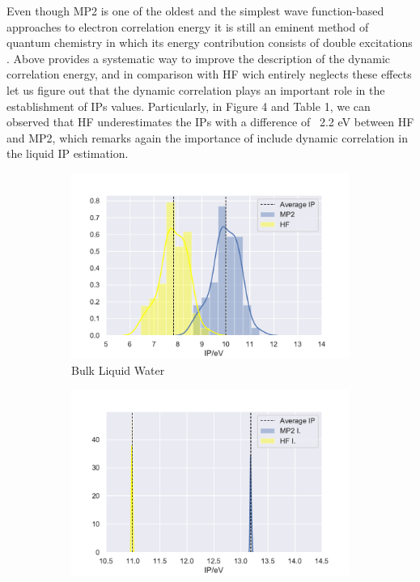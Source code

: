 \documentclass[12pt,a4paper]{article}
\begin{document}
Even though MP2 is one of the oldest and the simplest wave function-based approaches to electron correlation energy
it is still an eminent method 
of quantum chemistry in which its energy contribution consists of double excitations \cite{fink2016does}. 
Above provides a systematic way to
improve the description of the dynamic correlation energy, and in comparison with HF\cite{marshall1961unrestricted} 
wich entirely neglects these 
effects let us figure out that the dynamic correlation plays an important role in the establishment of IPs values.
Particularly, in Figure 4 and
Table 1, we can observed that HF underestimates the IPs with a difference of ~2.2 eV between HF and MP2,
which remarks again the importance of
include dynamic correlation in the liquid IP estimation. \\

\begin{figure}[!ht]
        \captionsetup[subfigure]{labelformat=empty}
        \centering
        \begin{subfigure}{0.4\linewidth}
                \includegraphics[width=\linewidth]{bulkhfmp2}
                \caption{Bulk Liquid Water}
        \end{subfigure}
        \begin{subfigure}{0.4\linewidth}
                \includegraphics[width=\linewidth]{isomp2dft}

\end{subfigure}
\end{figure}
\end{document}
